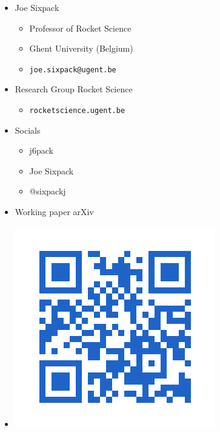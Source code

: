 \documentclass[aspectratio=169]{beamer}
\begin{document}
\begin{closingframe}
    \begin{minipage}{.4\textwidth}
    \begin{itemize}
        \itemsep.45cm
        \item Joe Sixpack 
            \begin{itemize}
                \item Professor of Rocket Science 
                \item Ghent University (Belgium)
                \item \texttt{joe.sixpack@ugent.be}
            \end{itemize}
        \item Research Group Rocket Science 
            \begin{itemize}
                \item \texttt{rocketscience.ugent.be}
            \end{itemize}
    \end{itemize}
    \end{minipage}%
    \begin{minipage}{.25\textwidth}
    \begin{itemize}
        \item Socials 
            \begin{itemize}
                \itemsep.2cm
                \item {} j6pack 
                \item {} Joe Sixpack 
                \item {} @sixpackj
            \end{itemize}
    \end{itemize}
    \end{minipage}%
    \begin{minipage}{.3\textwidth}
        \begin{itemize}
            \itemsep.25cm
            \item Working paper arXiv
            \item \hfill\includegraphics[height=.3\textheight]{qr_code.png}
        \end{itemize}
    \end{minipage}%
\end{closingframe}
\end{document}

